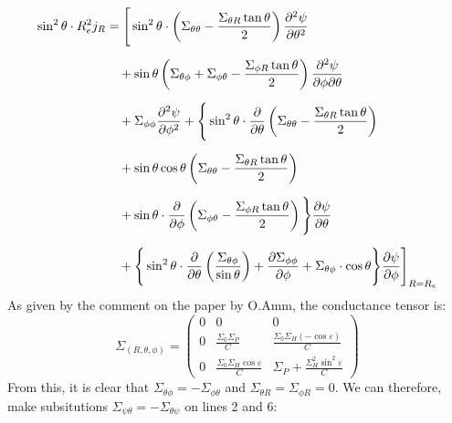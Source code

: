 \documentclass{article}
\begin{document}
\begin{equation*}
	\begin{aligned}
		\sin^2\theta \cdot R_e^2j_R
		 & =  \Bigg[
			\sin^2 \theta \cdot \left( \Sigma_{\theta\theta} - \frac{\Sigma_{\theta R} \tan\theta}{2} \right)
		\pdv[2]{\psi}{\theta}                                                         \\[6pt]
		 & \quad + \sin\theta
		\left( \Sigma_{\theta\phi} + \Sigma_{\phi\theta} - \frac{\Sigma_{\phi R} \tan\theta}{2} \right)
		\pdv{\psi}{\phi}{\theta}                                                      \\[6pt]
		 & \quad + \Sigma_{\phi\phi}
		\pdv[2]{\psi}{\phi} + \Bigg\{
		\sin^2\theta\cdot \pdv{\theta}
		\left( \Sigma_{\theta\theta} - \frac{\Sigma_{\theta R} \tan\theta}{2} \right) \\[6pt]
		 & \quad + \sin \theta\cos\theta
		\left( \Sigma_{\theta\theta} - \frac{\Sigma_{\theta R} \tan\theta}{2} \right) \\[6pt]
		 & \quad + \sin\theta\cdot
		\pdv{\phi}
		\left( \Sigma_{\phi\theta} - \frac{\Sigma_{\phi R} \tan\theta}{2} \right)
		\Bigg\}\pdv{\psi}{\theta}                                                     \\[6pt]
		 & \quad + \Bigg\{\sin^2\theta\cdot\pdv{\theta}
		\left( \frac{\Sigma_{\theta\phi}}{\sin\theta} \right) +
		\pdv{\Sigma_{\phi\phi}}{\phi}
		+ \Sigma_{\theta\phi}\cdot\cos\theta
		\Bigg\}\pdv{\psi}{\phi}
		\Bigg]_{R = R_e}
	\end{aligned}
\end{equation*}
As given by the comment on the paper by O.Amm, the conductance tensor is:
\begin{equation*}
	\Sigma_{(R, \theta,\phi)} = \left(\begin{matrix}
			0 & 0                                         & 0                                                \\
			0 & \frac{\Sigma_0\Sigma_P}{C}                & \frac{\Sigma_0\Sigma_H(-\cos\varepsilon)}{C}     \\
			0 & \frac{\Sigma_0\Sigma_H\cos\varepsilon}{C} & \Sigma_P + \frac{\Sigma_H^2\sin^2\varepsilon}{C}
		\end{matrix}\right)
\end{equation*}
From this, it is clear that $\Sigma_{\theta\phi} = -\Sigma_{\phi\theta}$ and $\Sigma_{\theta R} = \Sigma_{\phi R} = 0$. We can therefore, make subsitutions $\Sigma_{\psi\theta} = -\Sigma_{\theta\psi}$ on lines 2 and 6:
\end{document}
